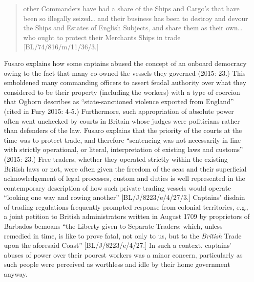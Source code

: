 \documentclass[12pt]{article}
\newenvironment{styleStandard}{\renewcommand\baselinestretch{1.0}\setlength\leftskip{0cm}\setlength\rightskip{0cm plus 1fil}\setlength\parindent{0cm}\setlength\parfillskip{0pt plus 1fil}\setlength\parskip{0in plus 1pt}\writerlistparindent\writerlistleftskip\leavevmode\normalfont\normalsize\writerlistlabel\ignorespaces}{\unskip\vspace{0in plus 1pt}\par}
\newcommand\writerlistleftskip{}
\newcommand\writerlistparindent{}
\newcommand\writerlistlabel{}
\begin{document}
\begin{quotation}
other Commanders have had a share of the Ships and Cargo’s that have been so illegally seized… and their business has been to destroy and devour the Ships and Estates of English Subjects, and share them as their own… who ought to protect their Merchants Ships in trade [BL/74/816/m/11/36/3.] 

\end{quotation}
\begin{styleStandard}
Fusaro explains how some captains abused the concept of an onboard democracy owing to the fact that many co-owned the vessels they governed (2015: 23.) This emboldened many commanding officers to assert feudal authority over what they considered to be their property (including the workers) with a type of coercion that Ogborn describes as “state-sanctioned violence exported from England” (cited in Fury 2015: 4-5.) Furthermore, such appropriation of absolute power often went unchecked by courts in Britain whose judges were politicians rather than defenders of the law. Fusaro explains that the priority of the courts at the time was to protect trade, and therefore “sentencing was not necessarily in line with strictly operational, or literal, interpretation of existing laws and customs” (2015: 23.) Free traders, whether they operated strictly within the existing British laws or not, were often given the freedom of the seas and their superficial acknowledgement of legal processes, custom and duties is well represented in the contemporary description of how such private trading vessels would operate “looking one way and rowing another” [BL/J/8223/e/4/27/3.] Captains’ disdain of trading regulations frequently prompted response from colonial territories, e.g., a joint petition to British administrators written in August 1709 by proprietors of Barbados bemoans “the Liberty given to Separate Traders; which, unless remedied in time, is like to prove fatal, not only to us, but to the \textit{British} Trade upon the aforesaid Coast” [BL/J/8223/e/4/27.] In such a context, captains’ abuses of power over their poorest workers was a minor concern, particularly as such people were perceived as worthless and idle by their home government anyway. 
\end{styleStandard}
\end{document}
